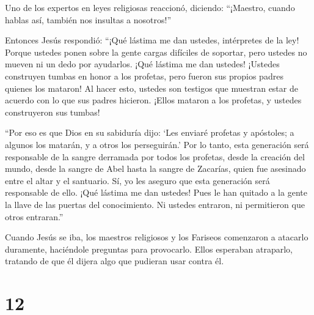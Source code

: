  Uno de los expertos en leyes religiosas reaccionó,
diciendo: ``¡Maestro, cuando hablas así, también nos insultas a
nosotros!''

 Entonces Jesús respondió: ``¡Qué lástima me dan ustedes,
intérpretes de la ley! Porque ustedes ponen sobre la gente cargas
difíciles de soportar, pero ustedes no mueven ni un dedo por ayudarlos.
 ¡Qué lástima me dan ustedes! ¡Ustedes construyen tumbas en
honor a los profetas, pero fueron sus propios padres quienes los
mataron!  Al hacer esto, ustedes son testigos que muestran
estar de acuerdo con lo que sus padres hicieron. ¡Ellos mataron a los
profetas, y ustedes construyeron sus tumbas!

 ``Por eso es que Dios en su sabiduría dijo: `Les enviaré
profetas y apóstoles; a algunos los matarán, y a otros los perseguirán.'
 Por lo tanto, esta generación será responsable de la
sangre derramada por todos los profetas, desde la creación del mundo,
 desde la sangre de Abel hasta la sangre de Zacarías, quien
fue asesinado entre el altar y el santuario. Sí, yo les aseguro que esta
generación será responsable de ello.  ¡Qué lástima me dan
ustedes! Pues le han quitado a la gente la llave de las puertas del
conocimiento. Ni ustedes entraron, ni permitieron que otros entraran.''

 Cuando Jesús se iba, los maestros religiosos y los
Fariseos comenzaron a atacarlo duramente, haciéndole preguntas para
provocarlo.  Ellos esperaban atraparlo, tratando de que él
dijera algo que pudieran usar contra él.

\hypertarget{section-11}{%
\section{12}\label{section-11}}

